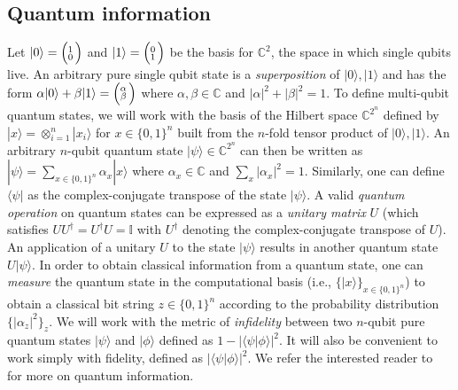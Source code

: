 \documentclass[11pt]{amsart}
\newcommand{\tvect}[2]{%
   \ensuremath{\Bigl(\negthinspace\begin{smallmatrix}#1\\#2\end{smallmatrix}\Bigr)}}
\newcommand{\ket}[1]{|#1\rangle}
\newcommand{\bra}[1]{\langle#1|}
\theoremstyle{plain}
\theoremstyle{definition}
\theoremstyle{remark}
\begin{document}
\subsection{Quantum information} Let $\ket{0}=\tvect{1}{0}$ and $\ket{1}=\tvect{0}{1}$ be the basis for $\mathbb{C}^2$, the space in which single qubits live. An arbitrary pure single qubit state is a \emph{superposition} of $\ket{0},\ket{1}$ and has the form $\alpha\ket{0}+\beta\ket{1}=\tvect{\alpha}{\beta}$ where $\alpha,\beta\in \mathbb{C}$ and $|\alpha|^2+|\beta|^2=1$. To define multi-qubit quantum states, we will work with the basis of the Hilbert space $\mathbb{C}^{2^n}$ defined by $\ket{x} = \otimes_{i=1}^n \ket{x_i}$ for $x \in \{0,1\}^n$ built from the $n$-fold tensor product of $\ket{0},\ket{1}$.
An arbitrary $n$-qubit quantum state $\ket{\psi}\in \mathbb{C}^{2^n}$ can then be written as $\ket{\psi}=\sum_{x\in \{0,1\}^n}\alpha_x \ket{x}$ where $\alpha_x\in \mathbb{C}$ and $\sum_x |\alpha_x|^2=1$. Similarly, one can define $\bra{\psi}$ as the complex-conjugate transpose of the state $\ket{\psi}$. A valid \emph{quantum operation} on quantum states can be expressed as a \emph{unitary matrix} $U$ (which satisfies $UU^\dagger =U^\dagger U=\mathbb{I}$ with $U^\dagger$ denoting the complex-conjugate transpose of $U$). An  application of a unitary $U$ to the state $\ket{\psi}$ results in another quantum state $U\ket{\psi}$. In order to obtain classical information from  a quantum state, one can \emph{measure} the quantum state in the computational basis (i.e., $\{\ket{x}\}_{x \in \{0,1\}^n}$) to obtain a classical bit string $z\in \{0,1\}^n$ according to the probability distribution $\{|\alpha_z|^2\}_z$. We will work with the metric of \emph{infidelity} between two $n$-qubit pure quantum states $\ket{\psi}$ and $\ket{\phi}$ defined as $1 - |\langle \psi | \phi \rangle|^2$. It will also be convenient to work simply with fidelity, defined as $|\langle \psi | \phi \rangle|^2$. We refer the interested reader to~\cite{nielsen2010quantum} for more on quantum information.
\end{document}
